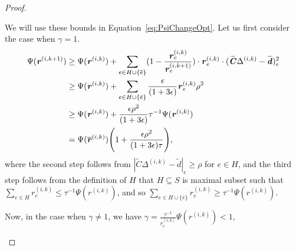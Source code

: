 \documentclass[11pt]{article}
\let\originalleft\left
\let\originalright\right
\renewcommand{\left}{\mathopen{}\mathclose\bgroup\originalleft}
\renewcommand{\right}{\aftergroup\egroup\originalright}
\newcommand\dd{\boldsymbol{\mathit{d}}}
\newcommand\rr{\boldsymbol{\mathit{r}}}
\newcommand\rrbar{\overline{\boldsymbol{\mathit{r}}}}
\newcommand\CC{\boldsymbol{\mathit{C}}}
\newcommand{\wt}{\widetilde}
\newcommand{\ov}{\overline}
\begin{document}
\begin{proof}
\begin{itemize}
We will use these bounds in Equation~\eqref{eq:PsiChangeOpt}. Let us first consider the case when $\gamma = 1$.
\begin{align*}
\Psi(\rr^{(i,k+1)}) & \geq \Psi(\rr^{(i,k)}) + \sum_{e \in H \cup \{\ov{e}\}} (1 - \frac{\rr^{(i,k)}_e}{\rr^{(i,k+1)}_e}) \cdot \rr^{(i,k)}_e \cdot (\wt{\CC} \Delta^{(i,k)} - \wt{\dd})_e^2 \\
& \geq \Psi(\rr^{(i,k)}) +  \sum_{e\in H\cup \{\bar{e}\}} \frac{\epsilon}{(1+3\epsilon)} \rr_{e}^{(i,k)} \rho^2\\
& \geq \Psi(\rr^{(i,k)}) + \frac{\epsilon\rho^2}{(1+3\epsilon)} \tau^{-1} \Psi(\rr^{(i,k)}) \\  
& = \Psi(\rrbar^{(i,k)}) \left(1 + \frac{\epsilon \rho^2}{(1+3\epsilon)\tau}\right),
\end{align*}
where the second step follows from $|\wt{\CC} \Delta^{(i,k)} - \wt{\dd}|_e \geq \rho$ for $e \in H$, and the third step follows from the definition of $H$ that $H \subseteq S$ is maximal subset such that $\sum_{e\in H}\rr^{(i,k)}_e\leq \tau^{-1}\Psi(\rr^{(i,k)})$, and so  $\sum_{e\in H \cup \{\ov{e}\}}\rr^{(i,k)}_e\geq \tau^{-1}\Psi(\rr^{(i,k)})$.

Now, in the case when $\gamma\neq 1$, we have $\gamma = \frac{\tau^{-1}}{ \rr^{(i,k)}_{\bar{e}}}\Psi(\rr^{(i,k)}) < 1$, 


\end{itemize}
\end{proof}
\end{document}
